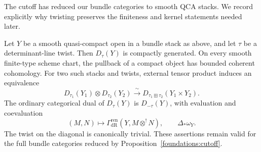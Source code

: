 The cutoff has reduced our bundle categories to smooth QCA stacks.
We record explicitly why twisting preserves the finiteness and kernel
statements needed later.

\begin{proposition}\label{foundations:categories}
Let $Y$ be a smooth quasi-compact open in a bundle stack as above, and
let $\tau$ be a determinant-line twist.  Then $D_\tau(Y)$ is compactly
generated.  On every smooth finite-type scheme chart, the pullback of a
compact object has bounded coherent cohomology.  For two such
stacks and twists, external tensor product induces an equivalence
\begin{equation}\label{foundations:kunneth}
 D_{\tau_1}(Y_1)\otimes D_{\tau_2}(Y_2)
 \xrightarrow{\ \sim\ }
 D_{\tau_1\boxplus\tau_2}(Y_1\times Y_2).
\end{equation}
The ordinary categorical dual of $D_\tau(Y)$ is $D_{-\tau}(Y)$, with
evaluation and coevaluation
\begin{equation}\label{foundations:evaluation}
 (M,N)\longmapsto
 \Gamma_{\mathrm{dR}}^{\mathrm{ren}}(Y,M\otimes^!N),
 \qquad \Delta_*\omega_Y.
\end{equation}
The twist on the diagonal is canonically trivial.  These assertions
remain valid for the full bundle categories reduced by
Proposition~\ref{foundations:cutoff}.
\end{proposition}

